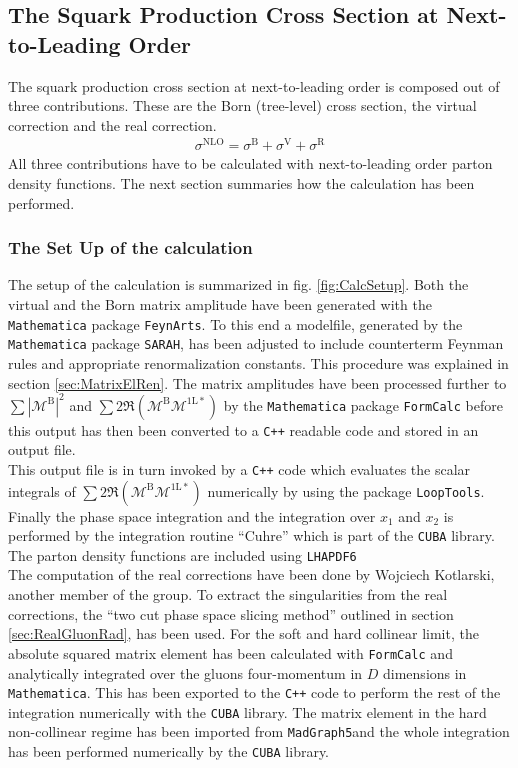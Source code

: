 \subsection{The Squark Production Cross Section at Next-to-Leading Order}
The squark production cross section at next-to-leading order is composed out of three contributions. These are the Born (tree-level) cross section, the virtual correction and the real correction. 
\begin{align}
\sigma^{\mathrm{NLO}} = \sigma^{\mathrm{B}} + \sigma^{\mathrm{V}} + \sigma^{\mathrm{R}}\label{eq:BVR}
\end{align}
All three contributions have to be calculated with next-to-leading order parton density functions. The next section summaries how the calculation has been performed.

\subsubsection{The Set Up of the calculation}
The setup of the calculation is summarized in fig. \ref{fig:CalcSetup}. Both the virtual and the Born matrix amplitude have been generated with the \texttt{Mathematica} package \texttt{FeynArts}. To this end a modelfile, generated by the \texttt{Mathematica} package \texttt{SARAH}, has been adjusted to include counterterm Feynman rules and appropriate renormalization constants. This procedure was explained in section \ref{sec:MatrixElRen}. The matrix amplitudes have been processed further to $\sum|\mathcal{M}^{\mathrm{B}}|^2$ and $ \sum 2\Re (\mathcal{M}^{\mathrm{B}} \mathcal{M}^{\mathrm{1L}\ast})$ by the \texttt{Mathematica} package \texttt{FormCalc} before this output has then been converted to a \texttt{C++} readable code and stored in an output file.\\
This output file is in turn invoked by a \texttt{C++} code which evaluates the scalar integrals of $ \sum 2\Re (\mathcal{M}^{\mathrm{B}} \mathcal{M}^{\mathrm{1L}\ast})$ numerically by using the package \texttt{LoopTools}. Finally the phase space integration and the integration over $x_1$ and $x_2$ is performed by the integration routine ``Cuhre'' which is part of the \texttt{CUBA} library\cite{Hahn:2004fe}. The parton density functions are included using \texttt{LHAPDF6}\cite{Buckley:2014ana}\\
The computation of the real corrections have been done by Wojciech Kotlarski, another member of the group. To extract the singularities from the real corrections, the ``two cut phase space slicing method'' outlined in section \ref{sec:RealGluonRad}, has been used. For the soft and hard collinear limit, the absolute squared matrix element has been calculated with \texttt{FormCalc} and analytically integrated over the gluons four-momentum in $D$ dimensions in \texttt{Mathematica}. This has been exported to the \texttt{C++} code to perform the rest of the integration numerically with the \texttt{CUBA} library. The matrix element in the hard non-collinear regime has been imported from \texttt{MadGraph5}\cite{Alwall:2014hca}and the whole integration has been performed numerically by the \texttt{CUBA} library.
